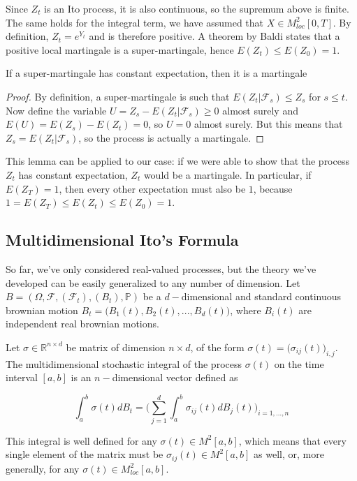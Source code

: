 Since $Z_t$ is an Ito process, it is also continuous, so the supremum above is finite. The same holds for the integral term, we have assumed that $X \in M^2_{loc}[0,T]$. By definition, $Z_t = e^{Y_t}$ and is therefore positive. A theorem by Baldi states that a positive local martingale is a super-martingale, hence $E(Z_t) \leq E(Z_0) = 1$. 

\begin{lemma}
    If a super-martingale has constant expectation, then it is a martingale
\end{lemma}
\begin{proof}
    By definition, a super-martingale is such that $E(Z_t \vert \mathcal{F}_s) \leq Z_s$ for $s \leq t$. Now define the variable $U = Z_s - E(Z_t \vert \mathcal{F}_s) \geq 0$ almost surely and $E(U) = E(Z_s) - E(Z_t) = 0$, so $U = 0$ almost surely. But this means that $Z_s = E(Z_t \vert \mathcal{F}_s)$, so the process is actually a martingale.  
\end{proof}

This lemma can be applied to our case: if we were able to show that the process $Z_t$ has constant expectation, $Z_t$ would be a martingale. In particular, if $E(Z_T) = 1$, then every other expectation must also be $1$, because $1 = E(Z_T) \leq E(Z_t) \leq E(Z_0) = 1$. 

\subsection{Multidimensional Ito's Formula}
So far, we've only considered real-valued processes, but the theory we've developed can be easily generalized to any number of dimension. Let $B = (\Omega, \mathcal{F}, (\mathcal{F}_t), (B_t), \mathbb{P})$ be a $d-$dimensional and standard continuous brownian motion $B_t = \big(B_1(t), B_2(t),...,B_d(t)\big)$, where $B_i(t)$ are independent real brownian motions. 

Let $\sigma \in \mathbb{R}^{n \times d}$ be matrix of dimension $n \times d$, of the form $\sigma(t) = \big( \sigma_{ij}(t) \big)_{i,j}$. The multidimensional stochastic integral of the process $\sigma(t)$ on the time interval $[a,b]$ is an $n-$dimensional vector defined as

\begin{equation*}
    \int_a^b \sigma(t) dB_t = \Bigg( \sum_{j=1}^d \int_a^b \sigma_{ij}(t) dB_j(t) \Bigg)_{i = 1,...,n}
\end{equation*}

This integral is well defined for any $\sigma(t) \in M^2[a,b]$, which means that every single element of the matrix must be $\sigma_{ij}(t) \in M^2[a,b]$ as well, or, more generally, for any $\sigma(t) \in M^2_{loc}[a,b]$. 

